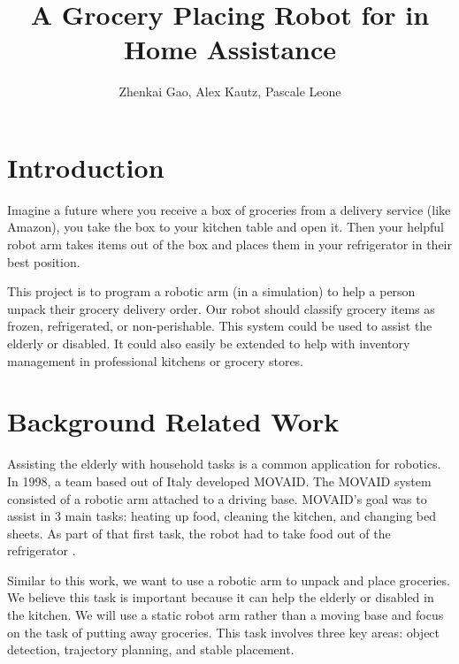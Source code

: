 \documentclass{article}
\title{A Grocery Placing Robot for in Home Assistance}
\author{Zhenkai Gao, Alex Kautz, Pascale Leone}
\date{\vspace{-1em}}
\begin{document}
\maketitle


\section{Introduction}


Imagine a future where you receive a box of groceries from a delivery service (like Amazon), you take the box to your kitchen table and open it. Then your helpful robot arm takes items out of the box and places them in your refrigerator in their best position.

This project is to program a robotic arm (in a simulation) to help a person unpack their grocery delivery order. Our robot should classify grocery items as frozen, refrigerated, or non-perishable. This system could be used to assist the elderly or disabled. It could also easily be extended to help with inventory management in professional kitchens or grocery stores.


\section{Background Related Work}

Assisting the elderly with household tasks is a common application for robotics. In 1998, a team based out of Italy developed MOVAID. The MOVAID system consisted of a robotic arm attached to a driving base. MOVAID's goal was to assist in 3 main tasks: heating up food, cleaning the kitchen, and changing bed sheets. As part of that first task, the robot had to take food out of the refrigerator \cite{doi:10.3233/TAD-1999-10202}.


Similar to this work, we want to use a robotic arm to unpack and place groceries. We believe this task is important because it can help the elderly or disabled in the kitchen. We will use a static robot arm rather than a moving base and focus on the task of putting away groceries. This task involves three key areas: object detection, trajectory planning, and stable placement.
\end{document}
